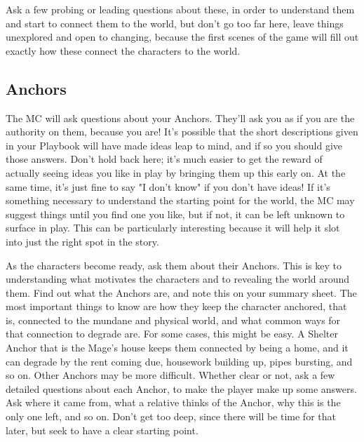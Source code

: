 \documentclass[
  oneside,
  statementpaper,
  9pt]{memoir}
\begin{document}
\begin{MC}

Ask a few probing or leading questions about these, in order to understand them and start to connect them to the world, but don’t go too far here, leave things unexplored and open to changing, because the first scenes of the game will fill out exactly how these connect the characters to the world.

\end{MC}

\hypertarget{anchors}{%
\subsection{Anchors}\label{anchors}}

\begin{Player}

The MC will ask questions about your Anchors. They'll ask you as if you are the authority on them, because you are! It's possible that the short descriptions given in your Playbook will have made ideas leap to mind, and if so you should give those answers. Don't hold back here; it's much easier to get the reward of actually seeing ideas you like in play by bringing them up this early on. At the same time, it's just fine to say "I don't know" if you don't have ideas! If it's something necessary to understand the starting point for the world, the MC may suggest things until you find one you like, but if not, it can be left unknown to surface in play. This can be particularly interesting because it will help it slot into just the right spot in the story.

\end{Player}

\begin{MC}

As the characters become ready, ask them about their Anchors. This is key to understanding what motivates the characters and to revealing the world around them. Find out what the Anchors are, and note this on your summary sheet. The most important things to know are how they keep the character anchored, that is, connected to the mundane and physical world, and what common ways for that connection to degrade are. For some cases, this might be easy. A Shelter Anchor that is the Mage’s house keeps them connected by being a home, and it can degrade by the rent coming due, housework building up, pipes bursting, and so on. Other Anchors may be more difficult. Whether clear or not, ask a few detailed questions about each Anchor, to make the player make up some answers. Ask where it came from, what a relative thinks of the Anchor, why this is the only one left, and so on. Don’t get too deep, since there will be time for that later, but seek to have a clear starting point.

\end{MC}
\end{document}
